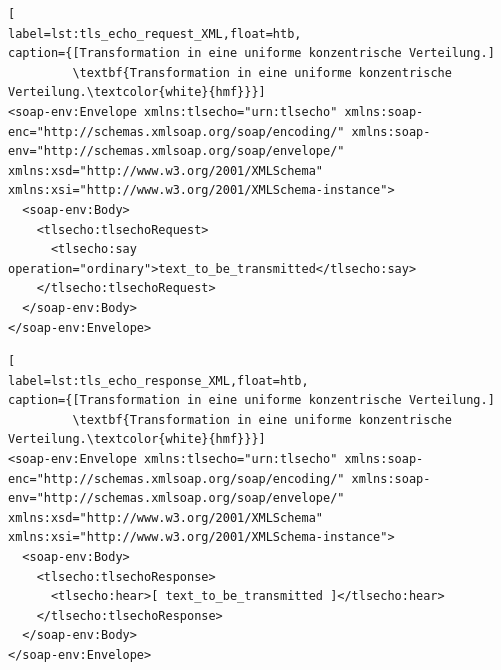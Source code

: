 \begin{lstlisting}[
label=lst:tls_echo_request_XML,float=htb,
caption={[Transformation in eine uniforme konzentrische Verteilung.]
         \textbf{Transformation in eine uniforme konzentrische Verteilung.\textcolor{white}{hmf}}}]
<soap-env:Envelope xmlns:tlsecho="urn:tlsecho" xmlns:soap-enc="http://schemas.xmlsoap.org/soap/encoding/" xmlns:soap-env="http://schemas.xmlsoap.org/soap/envelope/" xmlns:xsd="http://www.w3.org/2001/XMLSchema" xmlns:xsi="http://www.w3.org/2001/XMLSchema-instance">
  <soap-env:Body>
    <tlsecho:tlsechoRequest>
      <tlsecho:say operation="ordinary">text_to_be_transmitted</tlsecho:say>
    </tlsecho:tlsechoRequest>
  </soap-env:Body>
</soap-env:Envelope>
\end{lstlisting}






\begin{lstlisting}[
label=lst:tls_echo_response_XML,float=htb,
caption={[Transformation in eine uniforme konzentrische Verteilung.]
         \textbf{Transformation in eine uniforme konzentrische Verteilung.\textcolor{white}{hmf}}}]
<soap-env:Envelope xmlns:tlsecho="urn:tlsecho" xmlns:soap-enc="http://schemas.xmlsoap.org/soap/encoding/" xmlns:soap-env="http://schemas.xmlsoap.org/soap/envelope/" xmlns:xsd="http://www.w3.org/2001/XMLSchema" xmlns:xsi="http://www.w3.org/2001/XMLSchema-instance">
  <soap-env:Body>
    <tlsecho:tlsechoResponse>
      <tlsecho:hear>[ text_to_be_transmitted ]</tlsecho:hear>
    </tlsecho:tlsechoResponse>
  </soap-env:Body>
</soap-env:Envelope>
\end{lstlisting}

